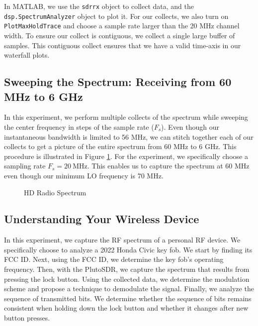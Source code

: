 \documentclass{article}
\begin{document}
In MATLAB, we use the \texttt{sdrrx} object to collect data, and the \texttt{dsp.SpectrumAnalyzer} object to plot it. For our collects, we also turn on \texttt{PlotMaxHoldTrace} and choose a sample rate larger than the 20 MHz channel width. To ensure our collect is contiguous, we collect a single large buffer of samples. This contiguous collect ensures that we have a valid time-axis in our waterfall plots.
 
\subsection{Sweeping the Spectrum: Receiving from 60 MHz to 6 GHz}

In this experiment, we perform multiple collects of the spectrum while sweeping the center frequency in steps of the sample rate ($F_s$). Even though our instantaneous bandwidth is limited to 56 MHz, we can stitch together each of our collects to get a picture of the entire spectrum from 60 MHz to 6 GHz. This procedure is illustrated in Figure \ref{fig::sweeping_the_spectrum}. For the experiment, we specifically choose a sampling rate $F_s = 20\ \text{MHz}$. This enables us to capture the spectrum at 60 MHz even though our minimum LO frequency is 70 MHz. 

\begin{figure}[H]
	\centerline{}
	\caption{HD Radio Spectrum}
	\label{fig::sweeping_the_spectrum}
\end{figure}

\subsection{Understanding Your Wireless Device}

In this experiment, we capture the RF spectrum of a personal RF device. We specifically choose to analyze a 2022 Honda Civic key fob. We start by finding its FCC ID. Next, using the FCC ID, we determine the key fob's operating frequency. Then, with the PlutoSDR, we capture the spectrum that results from pressing the lock button. Using the collected data, we determine the modulation scheme and propose a technique to demodulate the signal. Finally, we analyze the sequence of transmitted bits. We determine whether the sequence of bits remains consistent when holding down the lock button and whether it changes after new button presses.
\end{document}
